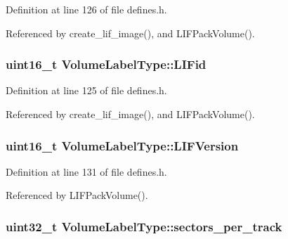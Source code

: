 Definition at line 126 of file defines.\+h.



Referenced by create\+\_\+lif\+\_\+image(), and L\+I\+F\+Pack\+Volume().

\subsubsection[{\texorpdfstring{L\+I\+Fid}{LIFid}}]{\setlength{\rightskip}{0pt plus 5cm}uint16\+\_\+t Volume\+Label\+Type\+::\+L\+I\+Fid}\hypertarget{structVolumeLabelType_a16bdde2d19114ac3238477c29fe75b4a}{}\label{structVolumeLabelType_a16bdde2d19114ac3238477c29fe75b4a}


Definition at line 125 of file defines.\+h.



Referenced by create\+\_\+lif\+\_\+image(), and L\+I\+F\+Pack\+Volume().

\subsubsection[{\texorpdfstring{L\+I\+F\+Version}{LIFVersion}}]{\setlength{\rightskip}{0pt plus 5cm}uint16\+\_\+t Volume\+Label\+Type\+::\+L\+I\+F\+Version}\hypertarget{structVolumeLabelType_a62003e63b2feeedb809d681e0fc4f1cc}{}\label{structVolumeLabelType_a62003e63b2feeedb809d681e0fc4f1cc}


Definition at line 131 of file defines.\+h.



Referenced by L\+I\+F\+Pack\+Volume().

\subsubsection[{\texorpdfstring{sectors\+\_\+per\+\_\+track}{sectors_per_track}}]{\setlength{\rightskip}{0pt plus 5cm}uint32\+\_\+t Volume\+Label\+Type\+::sectors\+\_\+per\+\_\+track}\hypertarget{structVolumeLabelType_a0014a4795dfcf4117212bba590fc889e}{}\label{structVolumeLabelType_a0014a4795dfcf4117212bba590fc889e}


